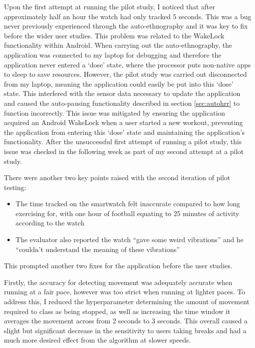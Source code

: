 \documentclass{l4proj}
\begin{document}
Upon the first attempt at running the pilot study, I noticed that after approximately half an hour the watch had only tracked 5 seconds. This was a bug never previously experienced through the auto-ethnography and it was key to fix before the wider user studies. This problem was related to the WakeLock functionality within Android. When carrying out the auto-ethnography, the application was connected to my laptop for debugging and therefore the application never entered a ‘dose’ state, where the processor puts non-native apps to sleep to save resources. However, the pilot study was carried out disconnected from my laptop, meaning the application could easily be put into this ‘dose’ state. This interfered with the sensor data necessary to update the application and caused the auto-pausing functionality described in section \ref{sec:autohrr} to function incorrectly. This issue was mitigated by ensuring the application acquired an Android WakeLock when a user started a new workout, preventing the application from entering this ‘dose’ state and maintaining the application’s functionality. After the unsuccessful first attempt of running a pilot study, this issue was checked in the following week as part of my second attempt at a pilot study.

There were another two key points raised with the second iteration of pilot testing:

\begin{itemize}
    \item The time tracked on the smartwatch felt inaccurate compared to how long exercising for, with one hour of football equating to 25 minutes of activity according to the watch
    \item The evaluator also reported the watch “gave some weird vibrations” and he “couldn’t understand the meaning of these vibrations”
\end{itemize}

This prompted another two fixes for the application before the user studies. 

Firstly, the accuracy for detecting movement was adequately accurate when running at a fair pace, however was too strict when running at lighter paces. To address this, I reduced the hyperparameter determining the amount of movement required to class as being stopped, as well as increasing the time window it averages the movement across from 2 seconds to 3 seconds. This overall caused a slight but significant decrease in the sensitivity to users taking breaks and had a much more desired effect from the algorithm at slower speeds.
\end{document}
